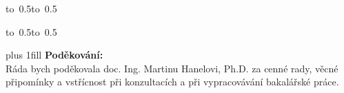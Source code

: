 \documentclass[12pt,a4paper]{report}
\begin{document}
\hbox{\hbox to 0.5\hbox to 0.5}

\vspace{1mm}
\hbox{\hbox to 0.5\hsize{%

\hss}\hbox to 0.5}

\vspace{20mm}

\newpage

\vglue 0pt plus 1fill
\noindent
{\bfseries Poděkování:} \\

Ráda bych poděkovala doc. Ing. Martinu Hanelovi, Ph.D. za cenné rady, věcné připomínky a vstřícnost při konzultacích a při vypracovávání bakalářské práce.

\newpage

\newpage
\end{document}
